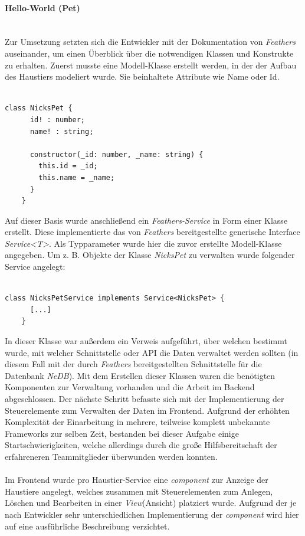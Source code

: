 \documentclass[10pt, a4paper]{article}
\begin{document}
\begin{onehalfspace}
\paragraph*{Hello-World (Pet)} $~$ \\
\label{HelloWorld}
Zur Umsetzung setzten sich die Entwickler mit der Dokumentation von \textit{Feathers} auseinander, um einen
Überblick über die notwendigen Klassen und Konstrukte zu erhalten. Zuerst musste eine Modell-Klasse erstellt werden, in der der Aufbau des Haustiers modeliert
wurde. Sie beinhaltete Attribute wie \glqq Name\grqq{} oder \glqq Id\grqq.
\\~\\
\begin{minipage}{\textwidth}
  \begin{lstlisting}[caption={NicksPet (Teil von Hello World)}, captionpos=b]
    class NicksPet {
      id! : number;
      name! : string;

      constructor(_id: number, _name: string) {
        this.id = _id;
        this.name = _name;
      }
    }
  \end{lstlisting}
\end{minipage}
Auf dieser Basis wurde anschließend ein \textit{Feathers-Service} in Form einer
Klasse erstellt. Diese implementierte das von \textit{Feathers} bereitgestellte generische Interface \textit{Service<T>}. Als Typparameter wurde hier
die zuvor erstellte Modell-Klasse angegeben. Um z. B. Objekte der Klasse \textit{NicksPet} zu verwalten wurde folgender Service angelegt:
\\~\\
\begin{minipage}{\textwidth}
  \begin{lstlisting}[caption={NicksPetService (Teil von Hello World)}, captionpos=b]
    class NicksPetService implements Service<NicksPet> {
      [...]
    }
  \end{lstlisting}
\end{minipage}
In dieser Klasse war außerdem ein Verweis aufgeführt, über welchen bestimmt wurde, mit welcher Schnittstelle oder API die Daten
verwaltet werden sollten (in diesem Fall mit der durch \textit{Feathers} bereitgestellten Schnittstelle für die Datenbank \textit{NeDB}).
Mit dem Erstellen dieser Klassen waren die benötigten Komponenten zur Verwaltung vorhanden und
 die Arbeit im Backend abgeschlossen. Der nächste Schritt befasste sich mit der Implementierung der Steuerelemente zum Verwalten der Daten im Frontend.
Aufgrund der erhöhten Komplexität der Einarbeitung in mehrere, teilweise komplett unbekannte Frameworks zur selben Zeit, bestanden bei dieser Aufgabe
einige Startschwierigkeiten, welche allerdings durch die große Hilfsbereitschaft der erfahreneren Teammitglieder überwunden werden konnten.
\\~\\
Im Frontend wurde pro Haustier-Service eine \textit{component} zur Anzeige der Haustiere angelegt,
welches zusammen mit Steuerelementen zum Anlegen, Löschen und Bearbeiten in einer \textit{View}(Ansicht) platziert wurde.
Aufgrund der je nach Entwickler sehr unterschiedlichen Implementierung der \textit{component} wird hier auf eine ausführliche Beschreibung verzichtet.


\end{onehalfspace}
\end{document}

